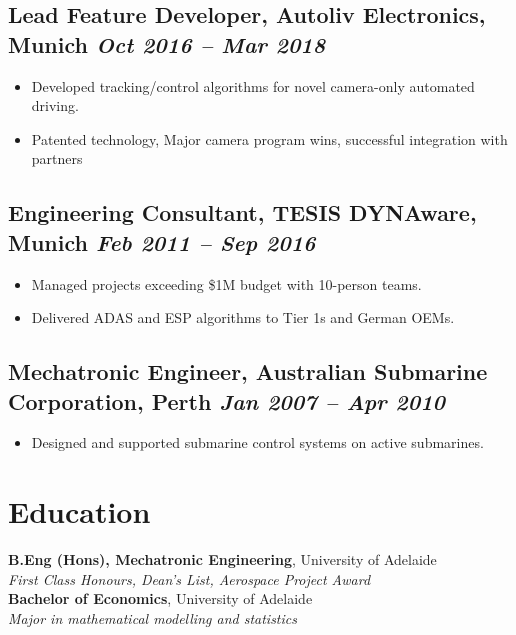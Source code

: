 \documentclass[10pt,a4paper]{article}
\begin{document}
\subsection*{Lead Feature Developer, Autoliv Electronics, Munich \hfill \textit{Oct 2016 – Mar 2018}}
\begin{itemize}
    \item Developed tracking/control algorithms for novel camera-only automated driving.
    \item Patented technology, Major camera program wins, successful integration with partners
\end{itemize}

\subsection*{Engineering Consultant, TESIS DYNAware, Munich \hfill \textit{Feb 2011 – Sep 2016}}
\begin{itemize}
    \item Managed projects exceeding \$1M budget with 10-person teams.
    \item Delivered ADAS and ESP algorithms to Tier 1s and German OEMs.
\end{itemize}

\subsection*{Mechatronic Engineer, Australian Submarine Corporation, Perth \hfill \textit{Jan 2007 – Apr 2010}}
\begin{itemize}
    \item Designed and supported submarine control systems on active submarines.
\end{itemize}

\vspace{1.2em}

\section*{Education}

\textbf{B.Eng (Hons), Mechatronic Engineering}, University of Adelaide \\
\textit{First Class Honours, Dean's List, Aerospace Project Award} \\[4pt]
\textbf{Bachelor of Economics}, University of Adelaide \\
\textit{Major in mathematical modelling and statistics}
\end{document}

